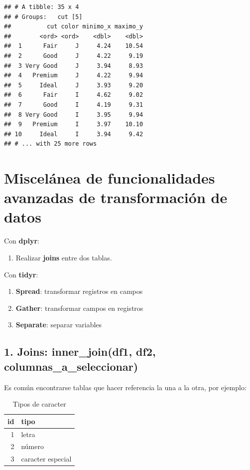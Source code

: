 \documentclass[]{book}
\providecommand{\tightlist}{%
  \setlength{\itemsep}{0pt}\setlength{\parskip}{0pt}}
\theoremstyle{definition}
\theoremstyle{definition}
\theoremstyle{definition}
\theoremstyle{remark}
\begin{document}
\begin{verbatim}
## # A tibble: 35 x 4
## # Groups:   cut [5]
##          cut color minimo_x maximo_y
##        <ord> <ord>    <dbl>    <dbl>
##  1      Fair     J     4.24    10.54
##  2      Good     J     4.22     9.19
##  3 Very Good     J     3.94     8.93
##  4   Premium     J     4.22     9.94
##  5     Ideal     J     3.93     9.20
##  6      Fair     I     4.62     9.02
##  7      Good     I     4.19     9.31
##  8 Very Good     I     3.95     9.94
##  9   Premium     I     3.97    10.10
## 10     Ideal     I     3.94     9.42
## # ... with 25 more rows
\end{verbatim}

\section{Miscelánea de funcionalidades avanzadas de transformación de
datos}\label{miscelanea-de-funcionalidades-avanzadas-de-transformacion-de-datos}

Con \textbf{dplyr}:

\begin{enumerate}
\def\labelenumi{\arabic{enumi}.}
\tightlist
\item
  Realizar \textbf{joins} entre dos tablas.
\end{enumerate}

Con \textbf{tidyr}:

\begin{enumerate}
\def\labelenumi{\arabic{enumi}.}
\setcounter{enumi}{1}
\tightlist
\item
  \textbf{Spread}: transformar registros en campos
\item
  \textbf{Gather}: transformar campos en registros
\item
  \textbf{Separate}: separar variables
\end{enumerate}

\subsection{1. Joins: inner\_join(df1, df2,
columnas\_a\_seleccionar)}\label{joins-inner_joindf1-df2-columnas_a_seleccionar}

Es común encontrarse tablas que hacer referencia la una a la otra, por
ejemplo:

\begin{table}

\caption{\label{tab:unnamed-chunk-29}Tipos de caracter}
\centering
\begin{tabular}[t]{r|l}
\hline
id & tipo\\
\hline
1 & letra\\
\hline
2 & número\\
\hline
3 & caracter especial\\
\hline
\end{tabular}
\end{table}
\end{document}
